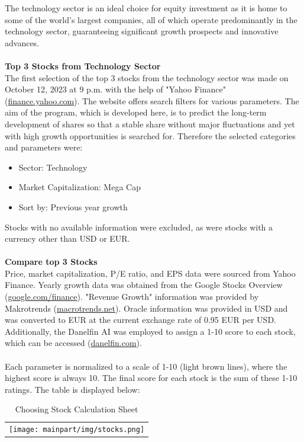 The technology sector is an ideal choice for equity investment as it is home to some of the world's largest companies, all of which operate predominantly in the technology sector, guaranteeing significant growth prospects and innovative advances.\\
\\
\textbf{Top 3 Stocks from Technology Sector}\\
The first selection of the top 3 stocks from the technology sector was made on October 12, 2023 at 9 p.m. with the help of "Yahoo Finance" (\url{finance.yahoo.com}). The website offers search filters for various parameters. The aim of the program, which is developed here, is to predict the long-term development of shares so that a stable share without major fluctuations and yet with high growth opportunities is searched for. Therefore the selected categories and parameters were:\\
\begin{itemize}
	\item Sector: Technology
	\item Market Capitalization: Mega Cap
	\item Sort by: Previous year growth\\
\end{itemize}
Stocks with no available information were excluded, as were stocks with a currency other than \ac{USD} or \ac{EUR}.\\
\\
\textbf{Compare top 3 Stocks}\\
Price, market capitalization, \ac{P/E ratio}, and \ac{EPS} data were sourced from Yahoo Finance. Yearly growth data was obtained from the Google Stocks Overview (\url{google.com/finance}). "Revenue Growth" information was provided by Makrotrends (\url{macrotrends.net}). Oracle information was provided in USD and was converted to EUR at the current exchange rate of 0.95 \ac{EUR} per \ac{USD}. Additionally, the Danelfin \ac{AI} was employed to assign a 1-10 score to each stock, which can be accessed (\url{danelfin.com}).\\
\\
Each parameter is normalized to a scale of 1-10 (light brown lines), where the highest score is always 10. The final score for each stock is the sum of these 1-10 ratings. The table is displayed below:
\begin{table}[H]
	\centering
	\begin{tabular}{c}
		\texttt{[image: mainpart/img/stocks.png]} \\
	\end{tabular}
	\caption{Choosing Stock Calculation Sheet}
	\label{tab: stocks}
\end{table}
